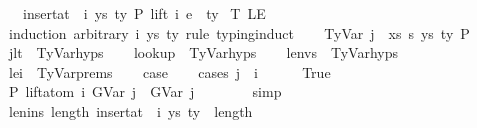 \begin{isabellebody}
\ \ \ {\isachardoublequoteopen}insert{\isacharunderscore}{\kern0pt}at\ {\isasymGamma}\ i\ {\isacharparenleft}{\kern0pt}ys{\isacharcomma}{\kern0pt}\ ty{}{\isacharparenright}{\kern0pt}\ {\isasymturnstile}{\isacharbraceleft}{\kern0pt}P{\isacharbraceright}{\kern0pt}\ {\isacharparenleft}{\kern0pt}lift\ i\ e{\isacharparenright}{\kern0pt}\ {\isacharcolon}{\kern0pt}\ ty{\isachardoublequoteclose}\isanewline
%
\isadelimproof
%
\endisadelimproof
%
\isatagproof
{}\isamarkupfalse%
\ T\ LE\isanewline
{}\isamarkupfalse%
\ {\isacharparenleft}{\kern0pt}induction\ arbitrary{\isacharcolon}{\kern0pt}\ i\ ys\ ty{}\ rule{\isacharcolon}{\kern0pt}\ typing{\isachardot}{\kern0pt}induct{\isacharparenright}{\kern0pt}\isanewline
\ \ \isamarkupfalse%
\ {\isacharparenleft}{\kern0pt}TyVar\ j\ {\isasymGamma}\ xs\ s\ ys\ ty\ P{\isacharparenright}{\kern0pt}\isanewline
\ \ \isamarkupfalse%
\ j{\isacharunderscore}{\kern0pt}lt\ {\isacharequal}{\kern0pt}\ TyVar{\isachardot}{\kern0pt}hyps{\isacharparenleft}{\kern0pt}{}{\isacharparenright}{\kern0pt}\isanewline
\ \ \isamarkupfalse%
\ lookup\ {\isacharequal}{\kern0pt}\ TyVar{\isachardot}{\kern0pt}hyps{\isacharparenleft}{\kern0pt}{}{\isacharparenright}{\kern0pt}\isanewline
\ \ \isamarkupfalse%
\ len{\isacharunderscore}{\kern0pt}vs\ {\isacharequal}{\kern0pt}\ TyVar{\isachardot}{\kern0pt}hyps{\isacharparenleft}{\kern0pt}{}{\isacharparenright}{\kern0pt}\isanewline
\ \ \isamarkupfalse%
\ le{\isacharunderscore}{\kern0pt}i\ {\isacharequal}{\kern0pt}\ TyVar{\isachardot}{\kern0pt}prems\isanewline
\isanewline
\ \ \isamarkupfalse%
\ {\isacharquery}{\kern0pt}case\isanewline
\ \ \isamarkupfalse%
\ {\isacharparenleft}{\kern0pt}cases\ {\isachardoublequoteopen}j\ {\isacharless}{\kern0pt}\ i{\isachardoublequoteclose}{\isacharparenright}{\kern0pt}\isanewline
\ \ \ \ \isamarkupfalse%
\ True\isanewline
\ \ \ \ \isamarkupfalse%
\ \isamarkupfalse%
\ P{}{\isacharcolon}{\kern0pt}\ {\isachardoublequoteopen}lift{\isacharunderscore}{\kern0pt}atom\ i\ {\isacharparenleft}{\kern0pt}GVar\ j{\isacharparenright}{\kern0pt}\ {\isacharequal}{\kern0pt}\ GVar\ j{\isachardoublequoteclose}\isanewline
\ \ \ \ \ \ \isamarkupfalse%
\ simp\isanewline
\isanewline
\ \ \ \ \isamarkupfalse%
\ len{\isacharunderscore}{\kern0pt}ins{\isacharcolon}{\kern0pt}\ {\isachardoublequoteopen}length\ {\isacharparenleft}{\kern0pt}insert{\isacharunderscore}{\kern0pt}at\ {\isasymGamma}\ i\ {\isacharparenleft}{\kern0pt}ys{\isacharcomma}{\kern0pt}\ ty{}{\isacharparenright}{\kern0pt}{\isacharparenright}{\kern0pt}\ {\isacharequal}{\kern0pt}\ length\ {\isasymGamma}\ {\isacharplus}{\kern0pt}\ {}{\isachardoublequoteclose}\isanewline

\end{isabellebody}
